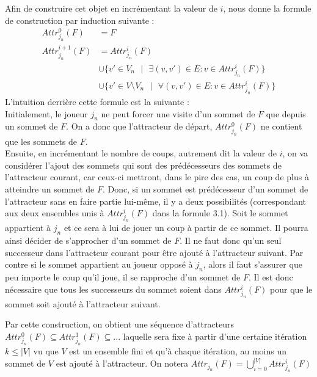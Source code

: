 \documentclass[12pt,a4paper,oneside,titlepage]{report}
\begin{document}
\noindent Afin de construire cet objet en incrémentant la valeur de $i$, \cite{Church} nous donne la formule de construction par induction suivante :
\begin{equation}
\label{eq:induction}
\begin{split}
Attr^0_{j_n}(F)&=F\\
Attr^{i+1}_{j_n}(F)&=Attr^i_{j_n}(F)\\
			&\cup \{v'\in V_n\text{ }|\text{ }\exists(v,v')\in E:v\in Attr^i_{j_n}(F)\}\\
			&\cup \{v'\in V\setminus V_n\text{ }|\text{ }\forall(v,v')\in E:v\in Attr^i_{j_n}(F)\}
\end{split}
\end{equation}
\noindent L'intuition derrière cette formule est la suivante :\\
Initialement, le joueur $j_n$ ne peut forcer une visite d'un sommet de $F$ que depuis un sommet de $F$. On a donc que l'attracteur de départ, $Attr^0_{j_n}(F)$ ne contient que les sommets de $F$.\\
Ensuite, en incrémentant le nombre de coups, autrement dit la valeur de $i$, on va considérer l'ajout des sommets qui sont des prédécesseurs des sommets de l'attracteur courant, car ceux-ci mettront, dans le pire des cas, un coup de plus à atteindre un sommet de $F$. Donc, si un sommet est prédécesseur d'un sommet de l'attracteur sans en faire partie lui-même, il y a deux possibilités (correspondant aux deux ensembles unis à $Attr^i_{j_n}(F)$ dans la formule 3.1). Soit le sommet appartient à $j_n$ et ce sera à lui de jouer un coup à partir de ce sommet. Il pourra ainsi décider de s'approcher d'un sommet de $F$. Il ne faut donc qu'un seul successeur dans l'attracteur courant pour être ajouté à l'attracteur suivant. Par contre si le sommet appartient au joueur opposé à $j_n$, alors il faut s'assurer que peu importe le coup qu'il joue, il se rapproche d'un sommet de $F$. Il est donc nécessaire que tous les successeurs du sommet soient dans $Attr^i_{j_n}(F)$ pour que le sommet soit ajouté à l'attracteur suivant.


Par cette construction, on obtient une séquence d'attracteurs $Attr_{j_n}^0(F)\subseteq Attr_{j_n}^1(F) \subseteq ...$ laquelle sera fixe à partir d'une certaine itération $k\leq|V|$ vu que $V$ est un ensemble fini et qu'à chaque itération, au moins un sommet de $V$ est ajouté à l'attracteur. On notera $Attr_{j_n}(F)=\bigcup_{i=0}^{|V|}Attr_{j_n}^i(F)$
\end{document}
